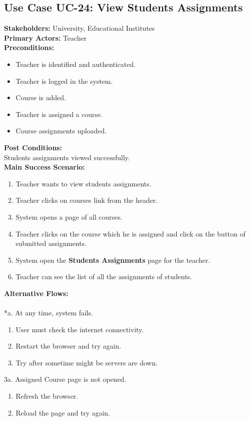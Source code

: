 \subsection{Use Case UC-24: View Students Assignments}
\textbf{Stakeholders: } University, Educational Institutes \\
\textbf{Primary Actors: } Teacher \\
\textbf{Preconditions:}
\begin{itemize}
\item Teacher is identified and authenticated.
\item Teacher is logged in the system.
\item Course is added.
\item Teacher is assigned a course.
\item Course assignments uploaded.
\end{itemize}
\textbf{Post Conditions: }\\
 Students assignments viewed successfully.\\
\textbf{Main Success Scenario:}
\begin{enumerate}
\item Teacher wants to view students assignments.
\item Teacher clicks on courses link from the header.
\item System opens a page of all courses.
\item Teacher clicks on the course which he is assigned and click on the button of submitted assignments.
\item System open the \textbf{Students Assignments} page for the teacher.
\item Teacher can see the list of all the assignments of students.
\end{enumerate}
\textbf{Alternative Flows:}\\
\\
*a. At any time, system fails.
\begin{enumerate}
\item User must check the internet connectivity.
\item Restart the browser and try again.
\item Try after sometime might be servers are down.
\end{enumerate}
3a. Assigned Course page is not opened.
\begin{enumerate}
\item Refresh the browser.
\item Reload the page and try again.
\end{enumerate}
